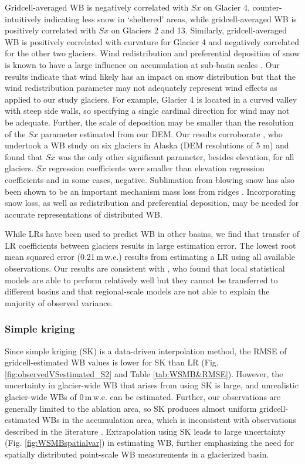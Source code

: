 \documentclass[twocolumn, letterpaper]{igs}
\begin{document}
Gridcell-averaged WB is negatively correlated with $Sx$ on Glacier 4, counter-intuitively indicating less snow in `sheltered' areas, while gridcell-averaged WB is positively correlated with $Sx$ on Glaciers 2 and 13. Similarly, gridcell-averaged WB is positively correlated with curvature for Glacier 4 and negatively correlated for the other two glaciers. Wind redistribution and preferential deposition of snow is known to have a large influence on accumulation at sub-basin scales \citep[e.g.][]{Dadic2010, Winstral2013,Gerber2017}. Our results indicate that wind likely has an impact on snow distribution but that the wind redistribution parameter may not adequately represent wind effects as applied to our study glaciers. For example, Glacier 4 is located in a curved valley with steep side walls, so specifying a single cardinal direction for wind may not be adequate. Further, the scale of deposition may be smaller than the resolution of the $Sx$ parameter estimated from our DEM. Our results corroborate \cite{McGrath2015}, who undertook a WB study on six glaciers in Alaska (DEM resolutions of 5 m) and found that $Sx$ was the only other significant parameter, besides elevation, for all glaciers. $Sx$ regression coefficients were smaller than elevation regression coefficients and in some cases, negative. Sublimation from blowing snow has also been shown to be an important mechanism mass loss from ridges  \citep[e.g.][]{Musselman2015}. Incorporating snow loss, as well as redistribution and preferential deposition, may be needed for accurate representations of distributed WB. 

While LRs have been used to predict WB in other basins, we find that transfer of LR coefficients between glaciers results in large estimation error. The lowest root mean squared error (0.21\,m\,w.e.) results from estimating a LR using all available observations. Our results are consistent with \cite{Grunewald2013}, who found that local statistical models are able to perform relatively well but they cannot be transferred to different basins and that regional-scale models are not able to explain the majority of observed variance. 

\subsubsection{Simple kriging}

Since simple kriging (SK) is a data-driven interpolation method, the RMSE of gridcell-estimated WB values is lower for SK than LR (Fig. \ref{fig:observedVSestimated_S2} and Table \ref{tab:WSMB&RMSE}). However, the uncertainty in glacier-wide WB that arises from using SK is large, and unrealistic glacier-wide WBs of 0\,m\,w.e. can be estimated. Further, our observations are generally limited to the ablation area, so SK produces almost uniform gridcell-estimated WBs in the accumulation area, which is inconsistent with observations described in the literature \citep[e.g.][]{Machguth2006, Grabiec2011}. Extrapolation using SK leads to large uncertainty (Fig. \ref{fig:WSMBspatialvar}) in estimating WB, further emphasizing the need for spatially distributed point-scale WB measurements in a glacierized basin.
\end{document}
